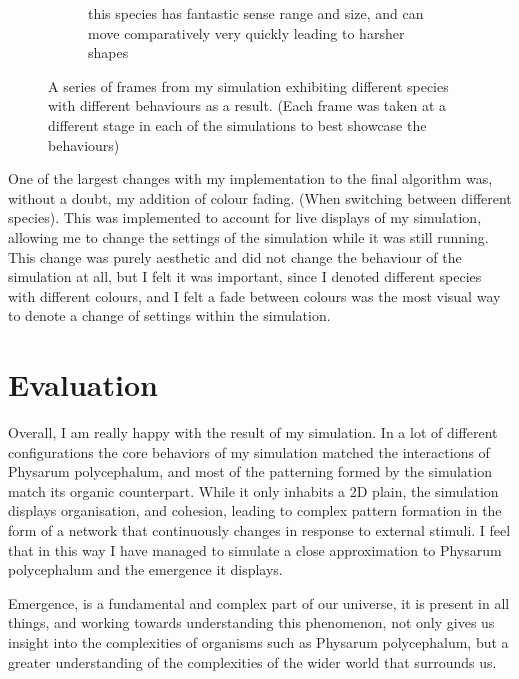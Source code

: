 \documentclass[]{report}
\begin{document}
\begin{figure}
\begin{subfigure}{0.3\textwidth}
        \caption{this species has fantastic sense range and size, and can move comparatively very quickly leading to harsher shapes}
        \label{fig:EPQ_6}
    \end{subfigure}
    \caption{A series of frames from my simulation exhibiting different species with different behaviours as a result. (Each frame was taken at a different stage in each of the simulations to best showcase the behaviours)}
    \label{fig:EPQ}
\end{figure}

One of the largest changes with my implementation to the final algorithm was, without a doubt, my addition of colour fading. (When switching between different species). This was implemented to account for live displays of my simulation, allowing me to change the settings of the simulation while it was still running. 
This change was purely aesthetic and did not change the behaviour of the simulation at all, but I felt it was important, since I denoted different species with different colours, and I felt a fade between colours was the most visual way to denote a change of settings within the simulation.

\section{Evaluation}
Overall, I am really happy with the result of my simulation. In a lot of different configurations the core behaviors of my simulation matched the interactions of \Gls{Physarum polycephalum}, and most of the patterning formed by the simulation match its organic counterpart. While it only inhabits a 2D plain, the simulation displays organisation, and cohesion, leading to complex pattern formation in the form of a network that continuously changes in response to external stimuli. I feel that in this way I have managed to simulate a close approximation to \Gls{Physarum polycephalum} and the emergence it displays.

Emergence, is a fundamental and complex part of our universe, it is present in all things, and working towards understanding this phenomenon, not only gives us insight into the complexities of organisms such as \Gls{Physarum polycephalum}, but a greater understanding of the complexities of the wider world that surrounds us.

\nocite{*}

\printbibliography
{}
\end{document}
